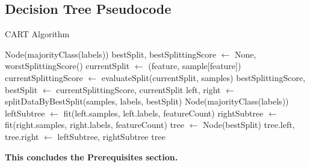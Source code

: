 \documentclass[10pt]{article} %
\begin{document}
{	\newpage


\subsection{Decision Tree Pseudocode}\label{decision_tree}

\begin{algorithm}
	\caption{CART Algorithm}
\begin{algorithmic}[1]
        \State \Return Node(majorityClass(labels)) 
    \EndIf
	\State bestSplit, bestSplittingScore $\gets$ None, worstSplittingScore()
			\State currentSplit $\gets$ (feature, sample[feature])
            \State currentSplittingScore $\gets$ evaluateSplit(currentSplit, samples)
                \State bestSplittingScore, bestSplit  $\gets$ currentSplittingScore, currentSplit
            \EndIf
        \EndFor
    \EndFor
    \State left, right $\gets$ splitDataByBestSplit(samples, labels, bestSplit)
		\State \Return Node(majorityClass(labels)) 
	\EndIf
    \State leftSubtree $\gets$ fit(left.samples, left.labels, featureCount)
    \State rightSubtree $\gets$ fit(right.samples, right.labels, featureCount)
    \State tree $\gets$ Node(bestSplit)
    \State tree.left, tree.right $\gets$ leftSubtree, rightSubtree
    \State \Return tree
\EndFunction
\end{algorithmic}
\end{algorithm}

\vfill

    \begin{center}
		\textbf{\large This concludes the Prerequisites section.}
    \end{center}

\newpage
}{} 


\maketitle

\end{document}
